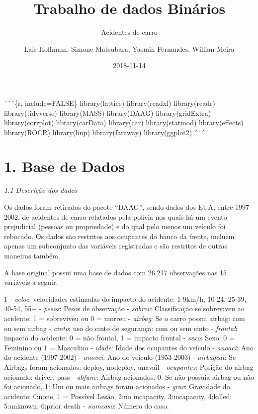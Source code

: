 \documentclass[]{article}
\title{Trabalho de dados Binários}
\subtitle{Acidentes de carro}
\author{Laís Hoffmam, Simone Matsubara, Yasmin Fernandes, Willian Meira}
\date{2018-11-14}
\begin{document}
\maketitle

´´´\{r, include=FALSE\} library(lattice) library(readxl) library(readr)
library(tidyverse) library(MASS) library(DAAG) library(gridExtra)
library(corrplot) library(carData) library(car) library(statmod)
library(effects) library(ROCR) library(hnp) library(faraway)
library(ggplot2) ´´´

\hypertarget{base-de-dados}{%
\section{1. Base de Dados}\label{base-de-dados}}

\emph{1.1 Descrição dos dados}

Os dados foram retirados do pacote ``DAAG'', sendo dados dos EUA, entre
1997-2002, de acidentes de carro relatados pela polícia nos quais há um
evento prejudicial (pessoas ou propriedade) e do qual pelo menos um
veículo foi rebocado. Os dados são restritos aos ocupantes do banco da
frente, incluem apenas um subconjunto das variáveis registradas e são
restritos de outras maneiras também.

A base original possui uma base de dados com 26.217 observações nas 15
variáveis a seguir.

1 - \emph{veloc}: velocidades estimadas do impacto do acidente: 1-9km/h,
10-24, 25-39, 40-54, 55+  - \emph{pesos}: Pesos de observação
 - \emph{sobrev}: Classificação se sobreviveu ao acidente: 1 =
sobreviveu ou 0 = morreu  - \emph{airbag}: Se o carro possui
airbag: com ou sem airbag  - \emph{cinto}: uso do cinto de
segurança: com ou sem cinto  - \emph{frontal}: impacto do
acidente: 0 = não frontal, 1 = impacto frontal  - \emph{sexo}:
Sexo: 0 = Feminino ou 1 = Masculino  - \emph{idade}: Idade dos
ocupantes do veículo  - \emph{anoaci}: Ano do acidente
(1997-2002)  - \emph{anovei}: Ano do veículo (1953-2003)
 - \emph{airbagcat}: Se Airbags foram acionados: deploy,
nodeploy, unavail  - \emph{ocupantes}: Posição do airbag
acionado: driver, pass  - \emph{abfunc}: Airbag acionados: 0:
Se não possuia airbag ou não foi acionado, 1: Um ou mais airbags foram
acionados  - \emph{grav}: Gravidade do acidente: 0:none, 1 =
Possível Lesão, 2:no incapacity, 3:incapacity, 4:killed; 5:unknown,
6:prior death  - \emph{numcaso}: Número do caso.
\end{document}
